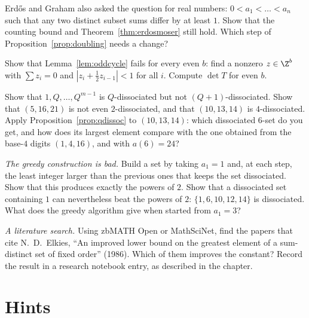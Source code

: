 \begin{exercise}[$\star\star$]\label{ex:realversion}
Erd\H os and Graham also asked the question for real numbers: $0<a_1<\dots<a_n$ such that any two distinct subset sums differ by at least $1$.
Show that the counting bound and Theorem~\ref{thm:erdosmoser} still hold. Which step of Proposition~\ref{prop:doubling} needs a change?
\end{exercise}

\begin{exercise}[$\star\star$]\label{ex:evencycle}
Show that Lemma~\ref{lem:oddcycle} fails for every even $b$: find a nonzero $z\in\Z^b$ with $\sum z_i=0$ and $|z_i+\frac12z_{i-1}|<1$ for all $i$. Compute $\det T$ for even $b$.
\end{exercise}

\begin{exercise}[$\star\star$]\label{ex:qthree}
Show that $1,Q,\dots,Q^{m-1}$ is $Q$-dissociated but not $(Q+1)$-dissociated. Show that $(5,16,21)$ is not even $2$-dissociated, and that $(10,13,14)$ is
$4$-dissociated. Apply Proposition~\ref{prop:qdissoc} to $(10,13,14)$: which dissociated $6$-set do you get, and how does its largest element compare with the one
obtained from the base-$4$ digits $(1,4,16)$, and with $a(6)=24$?
\end{exercise}

\begin{exercise}[$\star\star\star$]\label{ex:greedy}
\emph{The greedy construction is bad.} Build a set by taking $a_1=1$ and, at each step, the least integer larger than the previous ones that keeps
the set dissociated. Show that this produces exactly the powers of $2$. Show that a dissociated set containing $1$ can nevertheless beat the powers of $2$:
$\{1,6,10,12,14\}$ is dissociated. What does the greedy algorithm give when started from $a_1=3$?
\end{exercise}

\begin{exercise}[$\star$]\label{ex:litsearch}
\emph{A literature search.} Using zbMATH Open or MathSciNet, find the papers that cite N.~D.~Elkies, ``An improved lower bound on the greatest
element of a sum-distinct set of fixed order'' (1986). Which of them improves the constant? Record the result in a research notebook entry, as
described in the chapter.
\end{exercise}

\section{Hints}

